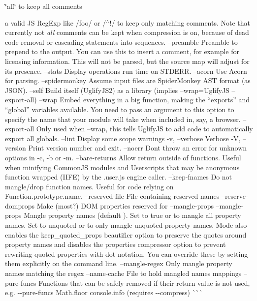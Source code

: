 \begin{DoxyItemize}
\item \char`\"{}all\char`\"{} to keep all comments
\item a valid JS Reg\+Exp like {\ttfamily /foo/} or {\ttfamily /$^\wedge$!/} to keep only matching comments. Note that currently not {\itshape all} comments can be kept when compression is on, because of dead code removal or cascading statements into sequences. --preamble Preamble to prepend to the output. You can use this to insert a comment, for example for licensing information. This will not be parsed, but the source map will adjust for its presence. --stats Display operations run time on S\+T\+D\+E\+RR. --acorn Use Acorn for parsing. --spidermonkey Assume input files are Spider\+Monkey A\+ST format (as J\+S\+ON). --self Build itself (Uglify\+J\+S2) as a library (implies --wrap=Uglify\+JS --export-\/all) --wrap Embed everything in a big function, making the “exports” and “global” variables available. You need to pass an argument to this option to specify the name that your module will take when included in, say, a browser. --export-\/all Only used when --wrap, this tells Uglify\+JS to add code to automatically export all globals. --lint Display some scope warnings -\/v, --verbose Verbose -\/V, --version Print version number and exit. --noerr Don\textquotesingle{}t throw an error for unknown options in -\/c, -\/b or -\/m. --bare-\/returns Allow return outside of functions. Useful when minifying Common\+JS modules and Userscripts that may be anonymous function wrapped (I\+I\+FE) by the .user.\+js engine {\ttfamily caller}. --keep-\/fnames Do not mangle/drop function names. Useful for code relying on Function.\+prototype.\+name. --reserved-\/file File containing reserved names --reserve-\/domprops Make (most?) D\+OM properties reserved for --mangle-\/props --mangle-\/props Mangle property names (default {}). Set to {\ttfamily true} or {} to mangle all property names. Set to {\ttfamily unquoted} or {} to only mangle unquoted property names. Mode {} also enables the {\ttfamily keep\+\_\+quoted\+\_\+props} beautifier option to preserve the quotes around property names and disables the {\ttfamily properties} compressor option to prevent rewriting quoted properties with dot notation. You can override these by setting them explicitly on the command line. --mangle-\/regex Only mangle property names matching the regex --name-\/cache File to hold mangled names mappings --pure-\/funcs Functions that can be safely removed if their return value is not used, e.\+g. {\ttfamily -\/-\/pure-\/funcs Math.\+floor console.\+info} (requires {\ttfamily -\/-\/compress}) \`{}\`{}\`{}
\end{DoxyItemize}

